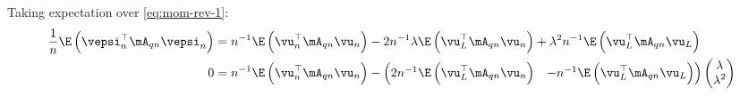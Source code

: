 Taking expectation over \eqref{eq:mom-rev-1}:
\begin{equation*}
  \begin{aligned}
 \frac{1}{n}\E\left(\vepsi^\top_n\mA_{qn}\vepsi_n\right) & = n^{-1}\E\left(\vu^\top_n\mA_{qn}\vu_n \right) - 2n^{-1}\lambda\E\left(\vu_L^\top\mA_{qn}\vu_n\right) + \lambda^2n^{-1}\E\left(\vu_L^\top\mA_{qn}\vu_L\right) \\
 0 & = n^{-1}\E\left(\vu^\top_n\mA_{qn}\vu_n \right) - \begin{pmatrix}
                                                           2n^{-1}\E\left(\vu_L^\top\mA_{qn}\vu_n\right) &   -n^{-1}\E\left(\vu_L^\top\mA_{qn}\vu_L\right)  
                                                       \end{pmatrix}
                                                       \begin{pmatrix}
                                                        \lambda \\
                                                        \lambda^2
                                                       \end{pmatrix}
 \end{aligned}
\end{equation*}

